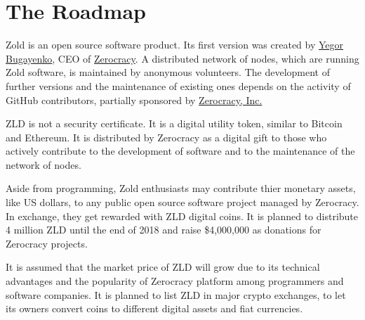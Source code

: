 \documentclass[12pt,oneside]{article}
\begin{document}
\pagebreak

\section*{The Roadmap}

Zold is an open source software product.
Its first version was created by \href{https://www.yegor256.com}{Yegor Bugayenko},
CEO of \href{https://www.zerocracy.com}{Zerocracy}.
A distributed network of nodes, which are running Zold software, is maintained by
anonymous volunteers. The development of further versions and the
maintenance of existing ones depends on the activity of GitHub
contributors, partially sponsored by \href{https://www.zerocracy.com}{Zerocracy, Inc.}

ZLD is not a security certificate.
It is a digital utility token, similar to Bitcoin and Ethereum.
It is distributed by Zerocracy as a digital gift to those who
actively contribute to the development of software and to the maintenance
of the network of nodes.

Aside from programming, Zold enthusiasts may contribute thier monetary assets,
like US dollars, to any public open source software project managed by Zerocracy.
In exchange, they get rewarded with ZLD digital coins. It is planned
to distribute 4 million ZLD until the end of 2018 and raise \$4,000,000 as donations
for Zerocracy projects.

It is assumed that the market price of ZLD will grow due to its technical
advantages and the popularity of Zerocracy platform among programmers
and software companies. It is planned to list ZLD in major crypto exchanges,
to let its owners convert coins to different digital assets and fiat currencies.
\end{document}
